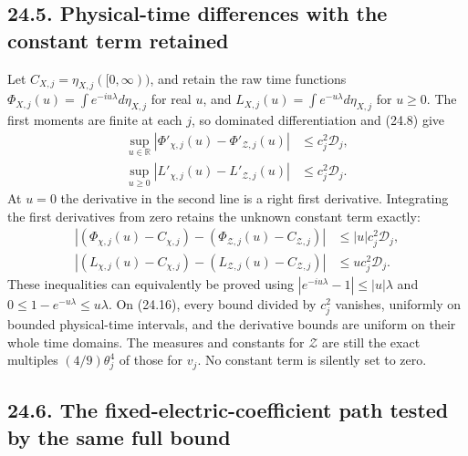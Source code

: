 \documentclass[
]{article}
\begin{document}
\subsection{24.5. Physical-time differences with the constant term
retained}\label{physical-time-differences-with-the-constant-term-retained}

Let \(C_{X,j}=\eta_{X,j}([0,\infty))\), and retain the raw time
functions \(\Phi_{X,j}(u)=\int e^{-iu\lambda}d\eta_{X,j}\) for real
\(u\), and \(L_{X,j}(u)=\int e^{-u\lambda}d\eta_{X,j}\) for \(u\ge0\).
The first moments are finite at each \(j\), so dominated differentiation
and (24.8) give \[
\begin{aligned}
\sup_{u\in\mathbb R}|\Phi'_{\chi,j}(u)-\Phi'_{\mathcal Z,j}(u)|
 &\le c_j^2\mathscr D_j,\\
\sup_{u\ge0}|L'_{\chi,j}(u)-L'_{\mathcal Z,j}(u)|
 &\le c_j^2\mathscr D_j .
\end{aligned}\tag{24.22}
\] At \(u=0\) the derivative in the second line is a right first
derivative. Integrating the first derivatives from zero retains the
unknown constant term exactly: \[
\begin{aligned}
|(\Phi_{\chi,j}(u)-C_{\chi,j})
       -(\Phi_{\mathcal Z,j}(u)-C_{\mathcal Z,j})|
 &\le |u|c_j^2\mathscr D_j,\\
|(L_{\chi,j}(u)-C_{\chi,j})
       -(L_{\mathcal Z,j}(u)-C_{\mathcal Z,j})|
 &\le u c_j^2\mathscr D_j .
\end{aligned}\tag{24.23}
\] These inequalities can equivalently be proved using
\(|e^{-iu\lambda}-1|\le|u|\lambda\) and
\(0\le1-e^{-u\lambda}\le u\lambda\). On (24.16), every bound divided by
\(c_j^2\) vanishes, uniformly on bounded physical-time intervals, and
the derivative bounds are uniform on their whole time domains. The
measures and constants for \(\mathcal Z\) are still the exact multiples
\((4/9)\theta_j^4\) of those for \(v_j\). No constant term is silently
set to zero.

\subsection{24.6. The fixed-electric-coefficient path tested by the same
full
bound}\label{the-fixed-electric-coefficient-path-tested-by-the-same-full-bound}
\end{document}
